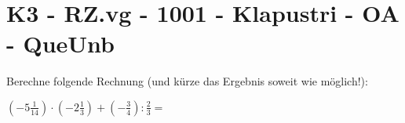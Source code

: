 \section{K3 - RZ.vg - 1001 - Klapustri - OA - QueUnb}

\begin{beispiel}{0} %
				Berechne folgende Rechnung (und kürze das Ergebnis soweit wie möglich!):
				
				\begin{center}
				$(-5\frac{1}{14})\cdot(-2\frac{1}{3})+(-\frac{3}{4}):\frac{2}{3}=$
				\end{center}
				
\end{beispiel}
